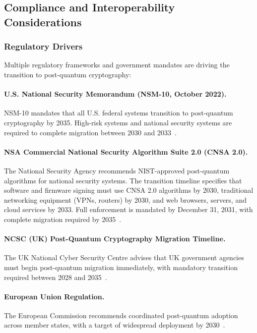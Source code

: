\documentclass[12pt,a4paper]{article}
\begin{document}
\subsection{Compliance and Interoperability Considerations}

\subsubsection{Regulatory Drivers}

Multiple regulatory frameworks and government mandates are driving the transition to post-quantum cryptography:

\paragraph{U.S. National Security Memorandum (NSM-10, October 2022).}
NSM-10 mandates that all U.S. federal systems transition to post-quantum cryptography by 2035. High-risk systems and national security systems are required to complete migration between 2030 and 2033~\cite{nsm-10-2022,omb-m23-02-2022}.

\paragraph{NSA Commercial National Security Algorithm Suite 2.0 (CNSA 2.0).}
The National Security Agency recommends NIST-approved post-quantum algorithms for national security systems. The transition timeline specifies that software and firmware signing must use CNSA 2.0 algorithms by 2030, traditional networking equipment (VPNs, routers) by 2030, and web browsers, servers, and cloud services by 2033. Full enforcement is mandated by December 31, 2031, with complete migration required by 2035~\cite{nsa-cnsa2-2022,nsa-cnsa2-faq-2024}.

\paragraph{NCSC (UK) Post-Quantum Cryptography Migration Timeline.}
The UK National Cyber Security Centre advises that UK government agencies must begin post-quantum migration immediately, with mandatory transition required between 2028 and 2035~\cite{ncsc-pqc-guidance-2024}.

\paragraph{European Union Regulation.}
The European Commission recommends coordinated post-quantum adoption across member states, with a target of widespread deployment by 2030~\cite{eu-pqc-recommendation-2024}.
\end{document}
